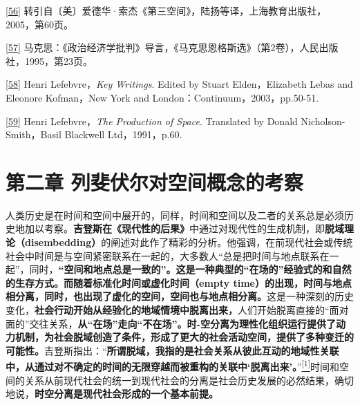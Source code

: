 \documentclass[UTF8, fontset = sourcesans, a4paper, oneside, zihao =
-4, scheme=chinese, no-math, space=true]{ctexbook}
\begin{document}
\protect\hypertarget{part0005_split_003.htmlux5cux23m56}{}{}\protect\hyperlink{part0005_split_003.htmlux5cux23w56}{{[}56{]}}
转引自〔美〕爱德华·索杰《第三空间》，陆扬等译，上海教育出版社，2005，第60页。

\protect\hypertarget{part0005_split_003.htmlux5cux23m57}{}{}\protect\hyperlink{part0005_split_003.htmlux5cux23w57}{{[}57{]}}
马克思：《政治经济学批判》导言，《马克思恩格斯选》（第2卷），人民出版社，1995，第23页。

\protect\hypertarget{part0005_split_003.htmlux5cux23m58}{}{}\protect\hyperlink{part0005_split_003.htmlux5cux23w58}{{[}58{]}}
Henri Lefebvre，\emph{Key Writings}. Edited by Stuart Elden，Elizabeth
Lebas and Eleonore Kofman，New York and
London：Continuum，2003，pp.50-51.

\protect\hypertarget{part0005_split_003.htmlux5cux23m59}{}{}\protect\hyperlink{part0005_split_003.htmlux5cux23w59}{{[}59{]}}
Henri Lefebvre，\emph{The Production of Space}. Translated by Donald
Nicholson-Smith，Basil Blackwell Ltd，1991，p.60.

\protect\hypertarget{part0006_split_000.html}{}{}

\hypertarget{part0006_split_000.htmlux5cux23a006}{\chapter{第二章
列斐伏尔对空间概念的考察}\label{part0006_split_000.htmlux5cux23a006}}

人类历史是在时间和空间中展开的，同样，时间和空间以及二者的关系总是必须历史地加以考察。\textbf{吉登斯在《现代性的后果》}中通过对现代性的生成机制，即\textbf{脱域理论（disembedding）}的阐述对此作了精彩的分析。他强调，在前现代社会或传统社会中时间是与空间紧密联系在一起的，大多数人``总是把时间与地点联系在一起''，同时，\textbf{``空间和地点总是一致的''。这是一种典型的``在场的''经验式的和自然的生存方式。而随着标准化时间或虚化时间（empty
time）的出现，时间与地点相分离，同时，也出现了虚化的空间，空间也与地点相分离。}这是一种深刻的历史变化，\textbf{社会行动开始从经验化的地域情境中脱离出来，}人们开始脱离直接的``面对面的''交往关系，\textbf{从``在场''走向``不在场''。时-空分离为理性化组织运行提供了动力机制，为社会脱域创造了条件，形成了更大的社会活动空间，提供了多种变迁的可能性。}吉登斯指出：``\textbf{所谓脱域，我指的是社会关系从彼此互动的地域性关联中，从通过对不确定的时间的无限穿越而被重构的关联中`脱离出来'。}''\protect\hypertarget{part0006_split_000.htmlux5cux23w1}{}{}\protect\hyperlink{part0006_split_003.htmlux5cux23m1}{\textsuperscript{{[}1{]}}}时间和空间的关系从前现代社会的统一到现代社会的分离是社会历史发展的必然结果，确切地说，\textbf{时空分离是现代社会形成的一个基本前提。}
\end{document}
